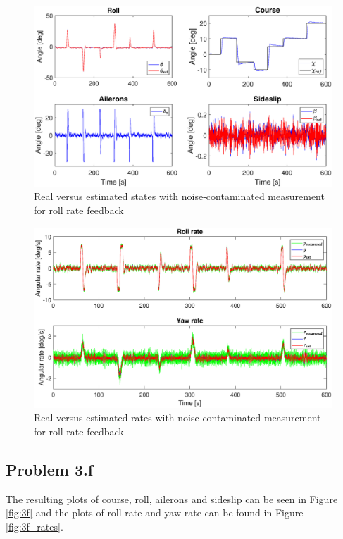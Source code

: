 \begin{figure}[h!]
    \centering
    \includegraphics[width=\textwidth]{figures/prob3e.eps}
    \caption{Real versus estimated states with noise-contaminated measurement for roll rate feedback}
    \label{fig:3e}
\end{figure}
\begin{figure}[h!]
    \centering
    \includegraphics[width=\textwidth]{figures/prob3e_rates.eps}
    \caption{Real versus estimated rates with noise-contaminated measurement for roll rate feedback}
    \label{fig:3e_rates}
\end{figure}



\subsection*{Problem 3.f}
The resulting plots of course, roll, ailerons and sideslip can be seen in Figure \ref{fig:3f} and the plots of roll rate and yaw rate can be found in Figure \ref{fig:3f_rates}. \\


